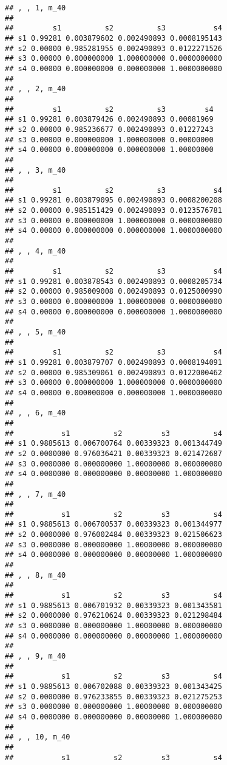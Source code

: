\documentclass[
]{article}
\begin{document}
\begin{verbatim}
## , , 1, m_40
## 
##         s1          s2          s3           s4
## s1 0.99281 0.003879602 0.002490893 0.0008195143
## s2 0.00000 0.985281955 0.002490893 0.0122271526
## s3 0.00000 0.000000000 1.000000000 0.0000000000
## s4 0.00000 0.000000000 0.000000000 1.0000000000
## 
## , , 2, m_40
## 
##         s1          s2          s3         s4
## s1 0.99281 0.003879426 0.002490893 0.00081969
## s2 0.00000 0.985236677 0.002490893 0.01227243
## s3 0.00000 0.000000000 1.000000000 0.00000000
## s4 0.00000 0.000000000 0.000000000 1.00000000
## 
## , , 3, m_40
## 
##         s1          s2          s3           s4
## s1 0.99281 0.003879095 0.002490893 0.0008200208
## s2 0.00000 0.985151429 0.002490893 0.0123576781
## s3 0.00000 0.000000000 1.000000000 0.0000000000
## s4 0.00000 0.000000000 0.000000000 1.0000000000
## 
## , , 4, m_40
## 
##         s1          s2          s3           s4
## s1 0.99281 0.003878543 0.002490893 0.0008205734
## s2 0.00000 0.985009008 0.002490893 0.0125000990
## s3 0.00000 0.000000000 1.000000000 0.0000000000
## s4 0.00000 0.000000000 0.000000000 1.0000000000
## 
## , , 5, m_40
## 
##         s1          s2          s3           s4
## s1 0.99281 0.003879707 0.002490893 0.0008194091
## s2 0.00000 0.985309061 0.002490893 0.0122000462
## s3 0.00000 0.000000000 1.000000000 0.0000000000
## s4 0.00000 0.000000000 0.000000000 1.0000000000
## 
## , , 6, m_40
## 
##           s1          s2         s3          s4
## s1 0.9885613 0.006700764 0.00339323 0.001344749
## s2 0.0000000 0.976036421 0.00339323 0.021472687
## s3 0.0000000 0.000000000 1.00000000 0.000000000
## s4 0.0000000 0.000000000 0.00000000 1.000000000
## 
## , , 7, m_40
## 
##           s1          s2         s3          s4
## s1 0.9885613 0.006700537 0.00339323 0.001344977
## s2 0.0000000 0.976002484 0.00339323 0.021506623
## s3 0.0000000 0.000000000 1.00000000 0.000000000
## s4 0.0000000 0.000000000 0.00000000 1.000000000
## 
## , , 8, m_40
## 
##           s1          s2         s3          s4
## s1 0.9885613 0.006701932 0.00339323 0.001343581
## s2 0.0000000 0.976210624 0.00339323 0.021298484
## s3 0.0000000 0.000000000 1.00000000 0.000000000
## s4 0.0000000 0.000000000 0.00000000 1.000000000
## 
## , , 9, m_40
## 
##           s1          s2         s3          s4
## s1 0.9885613 0.006702088 0.00339323 0.001343425
## s2 0.0000000 0.976233855 0.00339323 0.021275253
## s3 0.0000000 0.000000000 1.00000000 0.000000000
## s4 0.0000000 0.000000000 0.00000000 1.000000000
## 
## , , 10, m_40
## 
##           s1          s2         s3          s4

\end{verbatim}
\end{document}

